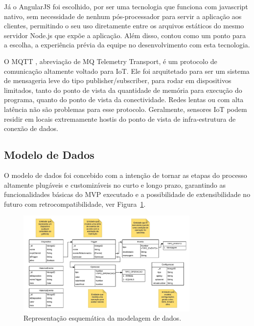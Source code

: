 Já o AngularJS \cite{AngularJS} foi escolhido, por ser uma tecnologia que funciona com javascript nativo, sem necessidade de nenhum pós-processador para servir a aplicação aos clientes, permitindo o seu uso diretamente entre os arquivos estáticos do mesmo servidor Node.js que expõe a aplicação. Além disso, contou como um ponto para a escolha, a experiência prévia da equipe no desenvolvimento com esta tecnologia.

O MQTT \cite{Mqtt}, abreviação de MQ Telemetry Transport, é um protocolo de comunicação altamente voltado para IoT. Ele foi arquitetado para ser um sistema de mensageria leve do tipo publisher/subscriber, para rodar em dispositivos limitados, tanto do ponto de vista da quantidade de memória para execução do programa, quanto do ponto de vista da conectividade. Redes lentas ou com alta latência não são problemas para esse protocolo. Geralmente, sensores IoT podem residir em locais extremamente hostis do ponto de vista de infra-estrutura de conexão de dados.

\subsection{Modelo de Dados}
O modelo de dados foi concebido com a intenção de tornar as etapas do processo altamente plugáveis e customizáveis no curto e longo prazo, garantindo as funcionalidades básicas do MVP executado e a possibilidade de extensibilidade no futuro com retrocompatibilidade, ver Figura~\ref{fig:modeloDeDados}.

\begin{figure}[h!]
	\begin{center}
		\includegraphics[width=0.8\textwidth]{./img/modelo-de-dados}
		\caption{Representação esquemática da modelagem de dados.}
		\label{fig:modeloDeDados}
	\end{center}
\end{figure}

